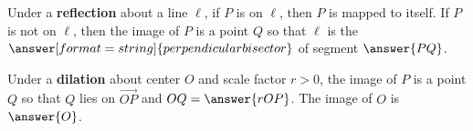 \documentclass[nooutcomes]{ximera}
\begin{document}
\begin{question}
Under a \textbf{reflection} about a line $\ell$, if $P$ is on $\ell$, then $P$ is mapped to itself.  If $P$ is not on $\ell$, then the image of $P$ is a point $Q$ so that $\ell$ is the 
$\answer[format=string]{perpendicular bisector}$ of segment $\answer{PQ}$.  
\end{question}

\begin{question}
Under a \textbf{dilation} about center $O$ and scale factor $r>0$, the image of $P$ is 
a point $Q$ so that $Q$ lies on $\overrightarrow{OP}$ and $OQ = \answer{rOP}$.  The image of $O$ is $\answer{O}$. 
\end{question}
\end{document}
